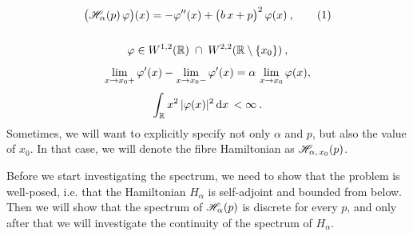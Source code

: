\begin{gather*}
    \big( \Hf_\alpha(p) \, \varphi \big)(x)
    = -\varphi''(x)
    + \big( b \, x + p \big)^2 \, \varphi(x) \: ,
    \numberthis\label{eqn-dirac-fibre-hamiltonian}
    \\[15pt]
    \varphi \in W^{1,2}(\R) \; \cap \; W^{2,2}( \R \setminus \{ x_0 \}) \: ,
    \\[5pt]
    \lim_{x \to x_0+} \varphi'(x) - \lim_{x \to x_0-} \varphi'(x) = \alpha \, \lim_{x \to x_0} \varphi(x),
    \\[3pt]
    \int_\R x^2 \, |\varphi(x)|^2 \d{x} < \infty \: .
\end{gather*}
Sometimes, we will want to explicitly specify not only $\alpha$ and $p$, but also the value of $x_0$. In that case, we will denote the fibre Hamiltonian as $\mathscr{H}_{\alpha, \, x_0}(p)$.

Before we start investigating the spectrum, we need to show that the problem is well-posed, i.e. that the Hamiltonian $H_\alpha$ is self-adjoint and bounded from below. Then we will show that the spectrum of $\mathscr{H}_\alpha(p)$ is discrete for every $p$, and only after that we will investigate the continuity of the spectrum of $H_\alpha$.

